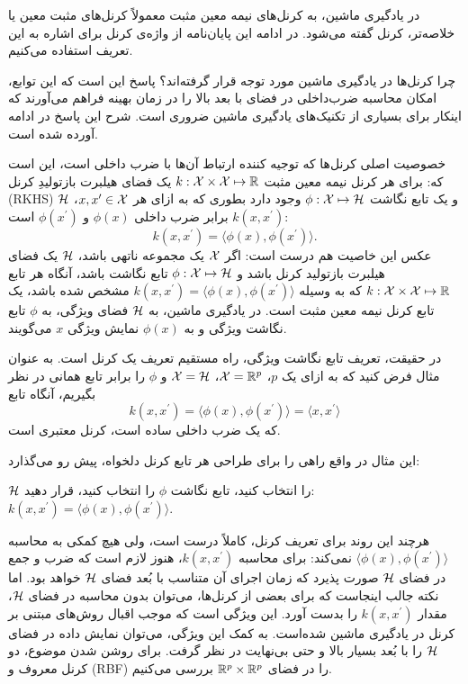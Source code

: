 در یادگیری ماشین، به کرنل‌های نیمه معین مثبت معمولاً کرنل‌های مثبت معین یا خلاصه‌تر، کرنل گفته می‌شود. در ادامه این پایان‌نامه از واژه‌ی کرنل برای اشاره به این تعریف استفاده می‌کنیم.

چرا کرنل‌ها در یادگیری ماشین مورد توجه قرار گرفته‌اند؟ پاسخ این است که این توابع، امکان محاسبه ضرب‌داخلی در فضای با بعد بالا را در زمان بهینه فراهم می‌آورند که اینکار برای بسیاری از تکنیک‌های یادگیری ماشین ضروری است. شرح این پاسخ در ادامه آورده شده است.

خصوصیت اصلی کرنل‌ها که توجیه کننده ارتباط آن‌ها با ضرب داخلی است، این است که: برای هر کرنل نیمه معین مثبت $k: \mathcal{X} \times \mathcal{X} \mapsto \mathbb{R}$ یک فضای هیلبرت  بازتولیدِ کرنل 
(RKHS) $\mathcal{H}$ و یک تابع نگاشت $\phi: \mathcal{X} \mapsto \mathcal{H}$ وجود دارد بطوری که
به ازای هر $x,x^\prime \in \mathcal{X}$،
$k(x,x^\prime)$
 برابر ضرب داخلی 
 $\phi(x)$ 
 و $\phi(x^\prime)$ است:
\begin{equation*}
k(x,x^\prime) = \langle\phi(x),\phi(x^\prime)\rangle.
\end{equation*}
عکس این خاصیت هم درست است: اگر $\mathcal{X}$ یک مجموعه ناتهی باشد، $\mathcal{H}$ یک فضای هیلبرت بازتولید کرنل باشد و $\phi: \mathcal{X} \mapsto \mathcal{H}$ تابع نگاشت باشد، آنگاه هر تابع $k: \mathcal{X}\times \mathcal{X} \mapsto \mathbb{R}$ که به وسیله $k(x,x^\prime) = \langle\phi(x),\phi(x^\prime)\rangle$ مشخص شده باشد، یک تابع کرنل نیمه معین مثبت است. در یادگیری ماشین، به $\mathcal{H}$ فضای ویژگی،
به $\phi$ تابع نگاشت ویژگی و
به $\phi(x)$ نمایش ویژگی
$x$ می‌گویند.

در حقیقت، تعریف تابع نگاشت ویژگی، راه مستقیم تعریف یک کرنل است. به عنوان مثال فرض کنید که به ازای یک $p$، 
$\mathcal{X} = \mathbb{R}^p$، $\mathcal{X} = \mathcal{H}$ و $\phi$ را برابر تابع همانی در نظر بگیریم، آنگاه تابع
\begin{equation*}
k(x,x^\prime) = \langle\phi(x),\phi(x^\prime)\rangle = \langle{x,x^\prime}\rangle
\end{equation*}
که یک ضرب داخلی ساده است، کرنل معتبری است.

این مثال در واقع راهی را برای طراحی هر تابع کرنل دلخواه، پیش رو می‌گذارد:
\begin{enumerate}
 $\mathcal{H}$ را انتخاب کنید،
 تابع نگاشت $\phi$ را انتخاب کنید،
 قرار دهید: $k(x,x^\prime) = \langle\phi(x),\phi(x^\prime)\rangle $.
\end{enumerate}

هرچند این روند برای تعریف کرنل، کاملاً درست است، ولی هیچ کمکی به محاسبه $\langle\phi(x),\phi(x^\prime)\rangle$ نمی‌کند: برای محاسبه $k(x,x^\prime)$، هنوز لازم است که ضرب و جمع در فضای $\mathcal{H}$ صورت پذیرد که زمان اجرای آن متناسب با بُعد فضای $\mathcal{H}$ خواهد بود. اما نکته جالب اینجاست که برای بعضی از کرنل‌ها، می‌توان بدون محاسبه در فضای $\mathcal{H}$، مقدار $k(x,x^\prime)$ را بدست آورد. این ویژگی است که موجب اقبال روش‌های مبتنی بر کرنل در یادگیری ماشین شده‌است. به کمک این ویژگی، می‌توان نمایش داده در فضای $\mathcal{H}$ را با بُعد بسیار بالا و حتی بی‌نهایت در نظر گرفت. برای روشن شدن موضوع، دو کرنل معروف  و (RBF) را در فضای $\mathbb{R}^p\times \mathbb{R}^p$ بررسی می‌کنیم.

